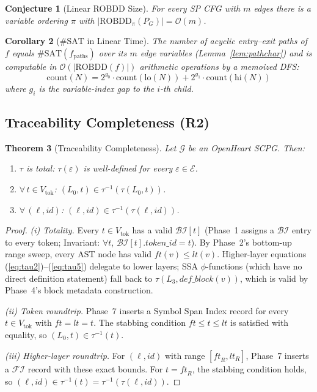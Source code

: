 \documentclass[journal,10pt,twoside]{IEEEtran}
\newtheorem{theorem}{Theorem}[section]
\newtheorem{corollary}[theorem]{Corollary}
\newtheorem{conjecture}[theorem]{Conjecture}
\newcommand{\SCPG}{\mathcal{G}}
\newcommand{\VT}{V_{\!\mathrm{tok}}}
\newcommand{\tauF}{\tau}
\newcommand{\tauI}{\tau^{-1}}
\newcommand{\FI}{\mathcal{FI}}
\newcommand{\BI}{\mathcal{BI}}
\newcommand{\ROBDD}{\mathrm{ROBDD}}
\newcommand{\SATC}{\#\mathrm{SAT}}
\newcommand{\BigO}{\mathcal{O}}
\begin{document}
\begin{conjecture}[Linear ROBDD Size]\label{conj:robdd}
For every SP CFG with $m$ edges there is a variable ordering
$\pi$ with $|\ROBDD_\pi(P_G)| = \BigO(m)$.
\end{conjecture}

\begin{corollary}[$\SATC$ in Linear Time]\label{cor:sat}
The number of acyclic entry--exit paths of $f$ equals
$\SATC(f_{\mathrm{paths}})$ over its $m$ edge variables
(Lemma~\ref{lem:pathchar}) and is computable in
$\BigO(|\ROBDD(f)|)$ arithmetic operations by a memoized DFS:
\[
  \mathrm{count}(N) = 2^{g_0}\!\cdot\!\mathrm{count}(\mathrm{lo}(N))
  + 2^{g_1}\!\cdot\!\mathrm{count}(\mathrm{hi}(N))
\]
where $g_i$ is the variable-index gap to the $i$-th child.
\end{corollary}

\subsection{Traceability Completeness (R2)}

\begin{theorem}[Traceability Completeness]\label{thm:trace}
Let $\SCPG$ be an OpenHeart SCPG.  Then:
\begin{enumerate}
\item[\emph{(i)}] $\tauF$ is total: $\tauF(\varepsilon)$
  is well-defined for every $\varepsilon \in \mathcal{E}$.
\item[\emph{(ii)}] $\forall\, t \in \VT$:
  $(L_0, t) \in \tauI(\tauF(L_0,t))$.
\item[\emph{(iii)}] $\forall\, (\ell, \mathit{id})$:
  $(\ell, \mathit{id}) \in \tauI(\tauF(\ell,\mathit{id}))$.
\end{enumerate}
\end{theorem}

\begin{proof}
\emph{(i) Totality.}
Every $t \in \VT$ has a valid $\BI[t]$ (Phase~1 assigns a
$\BI$ entry to every token; Invariant: $\forall t$,
$\BI[t].\mathit{token\_id} = t$).  By Phase~2's bottom-up
range sweep, every AST node has valid $\mathit{ft}(v) \le
\mathit{lt}(v)$.  Higher-layer equations
(\ref{eq:tau2})--(\ref{eq:tau5}) delegate to lower layers;
SSA $\phi$-functions (which have no direct definition
statement) fall back to $\tauF(L_3, \mathit{def\_block}(v))$,
which is valid by Phase~4's block metadata construction.

\emph{(ii) Token roundtrip.}
Phase~7 inserts a Symbol Span Index record for every
$t \in \VT$ with $\mathit{ft} = \mathit{lt} = t$.
The stabbing condition $\mathit{ft} \le t \le \mathit{lt}$
is satisfied with equality, so $(L_0, t) \in \tauI(t)$.

\emph{(iii) Higher-layer roundtrip.}
For $(\ell, \mathit{id})$ with range
$[\mathit{ft}_R, \mathit{lt}_R]$, Phase~7 inserts a $\FI$
record with these exact bounds.  For $t = \mathit{ft}_R$, the
stabbing condition holds, so $(\ell, \mathit{id})
\in \tauI(t) = \tauI(\tauF(\ell,\mathit{id}))$.
\end{proof}
\end{document}
